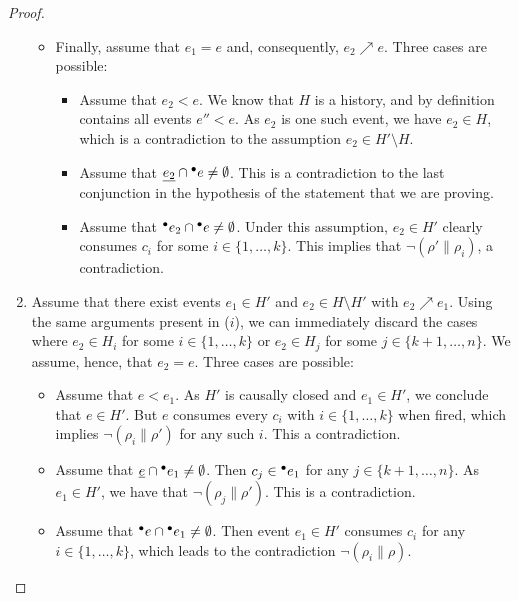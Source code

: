 \documentclass[12pt,a4paper]{article}
\begin{document}
\begin{proof}
\begin{enumerate}[$i$.]
\begin{itemize}
\item Finally, assume that $e_1 = e$ and, consequently, $e_2 \nearrow e$.
Three cases are possible:

\begin{itemize}
\item Assume that $e_2 < e$.  We know that $H$ is a history, and by definition
contains all events $e'' < e$.  As $e_2$ is one such event, we have $e_2 \in
H$, which is a contradiction to the assumption $e_2 \in H' \setminus H$.

\item Assume that $\underline{e_2} \cap {}^\bullet e \ne \emptyset$.  This is a
contradiction to the last conjunction in the hypothesis of the statement that
we are proving.

\item Assume that ${}^\bullet e_2 \cap {}^\bullet e \ne \emptyset$.  Under this
assumption, $e_2 \in H'$ clearly consumes $c_i$ for some $i \in \{1, \ldots,
k\}$.  This implies that $\lnot (\rho' \parallel \rho_i)$, a contradiction.
\end{itemize}
\end{itemize}

\item Assume that there exist events $e_1 \in H'$ and $e_2 \in H \setminus H'$
with $e_2 \nearrow e_1$.  Using the same arguments present in ($i$), we can
immediately discard the cases where $e_2 \in H_i$ for some $i \in \{1, \ldots,
k\}$ or $e_2 \in H_j$ for some $j \in \{k+1, \ldots, n\}$.  We assume, hence,
that $e_2 = e$.  Three cases are possible:

\begin{itemize}
\item Assume that $e < e_1$.  As $H'$ is causally closed and $e_1 \in H'$, we
conclude that $e \in H'$.  But $e$ consumes every $c_i$ with $i \in \{1,
\ldots, k\}$ when fired, which implies $\lnot (\rho_i \parallel \rho')$ for any
such $i$.  This a contradiction.

\item Assume that $\underline{e} \cap {}^\bullet e_1 \ne \emptyset$.  Then $c_j \in
{}^\bullet e_1$ for any $j \in \{k+1, \ldots, n\}$.  As $e_1 \in H'$, we have that
$\lnot (\rho_j \parallel \rho')$.  This is a contradiction.

\item Assume that ${}^\bullet e \cap {}^\bullet e_1 \ne \emptyset$.  Then event $e_1 \in
H'$ consumes $c_i$ for any $i \in \{1, \ldots, k\}$, which leads to the
contradiction $\lnot (\rho_i \parallel \rho)$.
\end{itemize}


\end{enumerate}
\end{proof}
\end{document}
